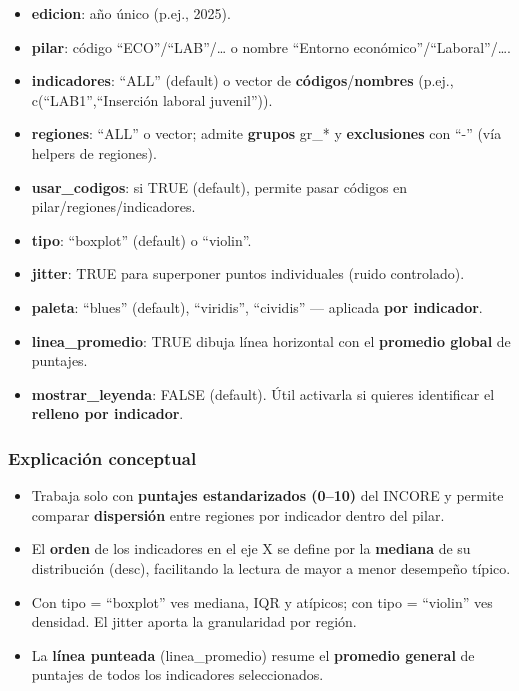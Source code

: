 \documentclass[
  11pt,
  letterpaper,
  DIV=11,
  numbers=noendperiod]{scrartcl}
\begin{document}
\begin{itemize}
\item
  \textbf{edicion}: año único (p.ej., 2025).
\item
  \textbf{pilar}: código ``ECO''/``LAB''/\ldots{} o nombre ``Entorno
  económico''/``Laboral''/\ldots.
\item
  \textbf{indicadores}: ``ALL'' (default) o vector de
  \textbf{códigos}/\textbf{nombres} (p.ej., c(``LAB1'',``Inserción
  laboral juvenil'')).
\item
  \textbf{regiones}: ``ALL'' o vector; admite \textbf{grupos} gr\_* y
  \textbf{exclusiones} con ``-'' (vía helpers de regiones).
\item
  \textbf{usar\_codigos}: si TRUE (default), permite pasar códigos en
  pilar/regiones/indicadores.
\item
  \textbf{tipo}: ``boxplot'' (default) o ``violin''.
\item
  \textbf{jitter}: TRUE para superponer puntos individuales (ruido
  controlado).
\item
  \textbf{paleta}: ``blues'' (default), ``viridis'', ``cividis'' ---
  aplicada \textbf{por indicador}.
\item
  \textbf{linea\_promedio}: TRUE dibuja línea horizontal con el
  \textbf{promedio global} de puntajes.
\item
  \textbf{mostrar\_leyenda}: FALSE (default). Útil activarla si quieres
  identificar el \textbf{relleno por indicador}.
\end{itemize}

\subsubsection{\texorpdfstring{\textbf{Explicación
conceptual}}{Explicación conceptual}}\label{explicaciuxf3n-conceptual-17}

\begin{itemize}
\item
  Trabaja solo con \textbf{puntajes estandarizados (0--10)} del INCORE y
  permite comparar \textbf{dispersión} entre regiones por indicador
  dentro del pilar.
\item
  El \textbf{orden} de los indicadores en el eje X se define por la
  \textbf{mediana} de su distribución (desc), facilitando la lectura de
  mayor a menor desempeño típico.
\item
  Con tipo = ``boxplot'' ves mediana, IQR y atípicos; con tipo =
  ``violin'' ves densidad. El jitter aporta la granularidad por región.
\item
  La \textbf{línea punteada} (linea\_promedio) resume el
  \textbf{promedio general} de puntajes de todos los indicadores
  seleccionados.
\end{itemize}
\end{document}
